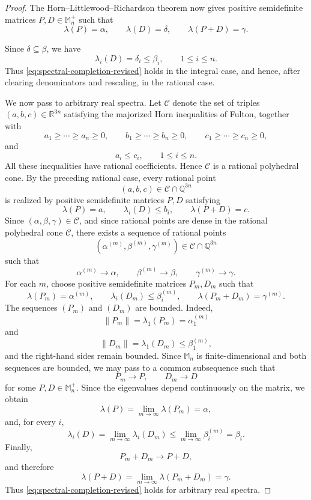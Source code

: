 \documentclass[11pt]{amsart}
\numberwithin{equation}{section}
\newcommand{\Mn}{\mathbb M_n}
\newcommand{\Mnp}{\mathbb M_n^+}
\begin{document}
\begin{proof}
The Horn--Littlewood--Richardson theorem now gives positive
semidefinite matrices \(P,D\in\Mnp\) such that
\[
    \lambda(P)=\alpha,\qquad
    \lambda(D)=\delta,\qquad
    \lambda(P+D)=\gamma.
\]

Since \(\delta\subseteq\beta\), we have
\[
    \lambda_i(D)=\delta_i\leq\beta_i,
    \qquad 1\leq i\leq n.
\]
Thus \eqref{eq:spectral-completion-revised} holds in the integral case,
and hence, after clearing denominators and rescaling, in the rational
case.

We now pass to arbitrary real spectra. Let \(\mathcal C\) denote the
set of triples \((a,b,c)\in\mathbb{R}^{3n}\) satisfying the majorized
Horn inequalities of Fulton, together with
\[
    a_1\geq\cdots\geq a_n\geq0,\qquad
    b_1\geq\cdots\geq b_n\geq0,\qquad
    c_1\geq\cdots\geq c_n\geq0,
\]
and
\[
    a_i\leq c_i,
    \qquad 1\leq i\leq n.
\]
All these inequalities have rational coefficients. Hence
\(\mathcal C\) is a rational polyhedral cone. 
By the preceding rational case, every rational point
\[
    (a,b,c)\in\mathcal C\cap\mathbb{Q}^{3n}
\]
is realized by positive semidefinite matrices \(P,D\) satisfying
\[
    \lambda(P)=a,\qquad
    \lambda_i(D)\leq b_i,\qquad
    \lambda(P+D)=c.
\]
Since \((\alpha,\beta,\gamma)\in\mathcal C\), and since rational
points are dense in the rational polyhedral cone \(\mathcal C\), there
exists a sequence of rational points
\[
    (\alpha^{(m)},\beta^{(m)},\gamma^{(m)})
    \in\mathcal C\cap\mathbb{Q}^{3n}
\]
such that
\[
    \alpha^{(m)}\longrightarrow\alpha,\qquad
    \beta^{(m)}\longrightarrow\beta,\qquad
    \gamma^{(m)}\longrightarrow\gamma.
\]
For each \(m\), choose positive semidefinite matrices
\(P_m,D_m\) such that
\[
    \lambda(P_m)=\alpha^{(m)},\qquad
    \lambda_i(D_m)\leq\beta_i^{(m)},\qquad
    \lambda(P_m+D_m)=\gamma^{(m)}.
\]
The sequences \((P_m)\) and \((D_m)\) are bounded. Indeed,
\[
    \|P_m\|
    =\lambda_1(P_m)
    =\alpha_1^{(m)}
\]
and
\[
    \|D_m\|
    =\lambda_1(D_m)
    \leq\beta_1^{(m)},
\]
and the right-hand sides remain bounded.
Since $\Mn$ is finite-dimensional and both sequences are bounded,
we may pass to a common subsequence such that
\[
    P_m\longrightarrow P,\qquad
    D_m\longrightarrow D
\]
for some \(P,D\in\Mnp\). 
Since the  eigenvalues depend continuously on the matrix, we
obtain
\[
    \lambda(P)
    =\lim_{m\to\infty}\lambda(P_m)
    =\alpha,
\]
and, for every \(i\),
\begin{equation}\label{eq:eigenvalue-continuity}
    \lambda_i(D)
    =\lim_{m\to\infty}\lambda_i(D_m)
    \leq
    \lim_{m\to\infty}\beta_i^{(m)}
    =\beta_i.
\end{equation}
Finally,
\[
    P_m+D_m\longrightarrow P+D,
\]
and therefore
\[
    \lambda(P+D)
    =
    \lim_{m\to\infty}\lambda(P_m+D_m)
    =
    \gamma.
\]
Thus \eqref{eq:spectral-completion-revised} holds for arbitrary real
spectra.


\end{proof}
\end{document}
